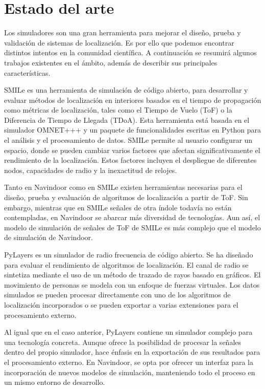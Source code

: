 \section{Estado del arte}\label{S2}
Los simuladores son una gran herramienta para mejorar el diseño, prueba y validación de sistemas de localización. Es por ello que podemos encontrar distintos intentos en la comunidad científica. A continuación se resumirá algunos trabajos existentes en el ámbito, además de describir sus principales características.

SMILe  \cite{Jankowski2018} es una herramienta de simulación de código abierto, para desarrollar y evaluar métodos de localización en interiores basados en el tiempo de propagación como métricas de localización, tales como el Tiempo de Vuelo (ToF) o la Diferencia de Tiempo de Llegada (TDoA). Esta herramienta está basada en el simulador OMNET+++ y un paquete de funcionalidades escritas en Python para el análisis y el procesamiento de datos. SMILe permite al usuario configurar un espacio, donde se pueden cambiar varios factores que afectan significativamente el rendimiento de la localización. Estos factores incluyen el despliegue de diferentes nodos, capacidades de radio y la inexactitud de relojes.

Tanto en Navindoor como en SMILe existen herramientas necesarias para el diseño, prueba y evaluación de algoritmos de localización a partir de ToF. Sin embargo, mientras que en SMILe señales de otra índole todavía no están contempladas, en Navindoor se abarcar más diversidad de tecnologías. Aun así, el modelo de simulación de señales de ToF de SMILe es más complejo que el modelo de simulación de Navindoor. 

PyLayers\cite{Amiot2013} es un simulador de radio frecuencia de código abierto. Se ha diseñado para evaluar el rendimiento de algoritmos de localización. El canal de radio se sintetiza mediante el uso de un  método de trazado de rayos basado en gráficos. El movimiento de personas se modela con un enfoque de fuerzas virtuales. Los datos simulados se pueden procesar directamente con uno de los algoritmos de localización incorporados o se pueden exportar a varias extensiones para el procesamiento externo. 

Al igual que en el caso anterior, PyLayers contiene un simulador complejo para una tecnología concreta. Aunque ofrece la posibilidad de procesar la señales dentro del propio simulador, hace énfasis en la exportación de sus resultados para el procesamiento externo. En Navindoor, se opta por ofrecer un interfaz para la incorporación de nuevos modelos de simulación, manteniendo todo el proceso en un mismo entorno de desarrollo.

